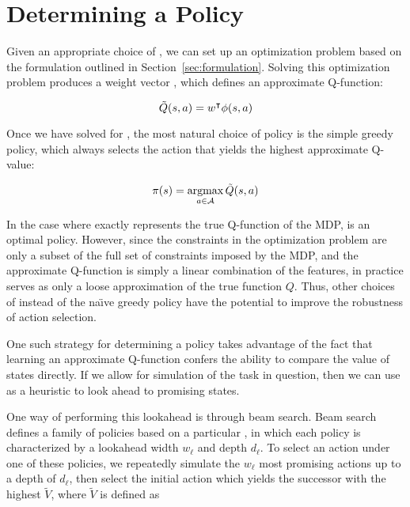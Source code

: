 \section{Determining a Policy}



Given an appropriate choice of \featurefn{}, we can set up an optimization
problem based on the formulation outlined in
Section~\ref{sec:formulation}. Solving this optimization problem produces a
weight vector \weights{}, which defines an approximate Q-function:

\begin{equation}
  \tilde{Q}(s,a) = w^\intercal \phi({s}, {a})
\end{equation}


Once we have solved for \approxq{}, the most natural choice of policy is the
simple greedy policy, which always selects the action that yields the highest
approximate Q-value:

\begin{equation}
  \pi(s) = \operatorname*{argmax}_{a \in \mathcal{A}} \tilde{Q}(s,a)
\end{equation}

In the case where \approxq{} exactly represents the true Q-function of the MDP,
\policyvar{} is an optimal policy. However, since the constraints in the optimization
problem are only a subset of the full set of constraints imposed by the MDP, and
the approximate Q-function is simply a linear combination of the features, in
practice \approxq{} serves as only a loose approximation of the true function
$Q$. Thus, other choices of \policyvar{} instead of the na\"{\i}ve greedy
policy have the potential to improve the robustness of action selection.

One such strategy for determining a policy takes advantage of the fact that
learning an approximate Q-function confers the ability to compare the value of
states directly. If we allow for simulation of the task in question, then we can
use \approxq{} as a heuristic to look ahead to promising states.

One way of performing this lookahead is through beam search. Beam search defines
a family of policies based on a particular \approxq{}, in which each policy is
characterized by a lookahead width $w_\ell$ and depth $d_\ell$. To select an action under
one of these policies, we repeatedly simulate the $w_\ell$ most promising actions up
to a depth of $d_\ell$, then select the initial action which yields the successor
with the highest $\tilde{V}$, where $\tilde{V}$ is defined as


